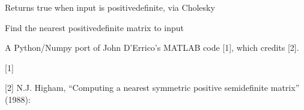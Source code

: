 \documentclass[letterpaper,10pt,english]{sphinxmanual}
\begin{document}
\begin{fulllineitems}

\begin{fulllineitems}
\label{\detokenize{classes:classes.pyETM.ETM.isPD}}
\pysigstartsignatures
{}
\pysigstopsignatures
\sphinxAtStartPar
Returns true when input is positive\sphinxhyphen{}definite, via Cholesky

\end{fulllineitems}


\begin{fulllineitems}
\label{\detokenize{classes:classes.pyETM.ETM.load_parameters}}
\pysigstartsignatures
{}
\pysigstopsignatures
\end{fulllineitems}


\begin{fulllineitems}
\label{\detokenize{classes:classes.pyETM.ETM.nearestPD}}
\pysigstartsignatures
{}
\pysigstopsignatures
\sphinxAtStartPar
Find the nearest positive\sphinxhyphen{}definite matrix to input

\sphinxAtStartPar
A Python/Numpy port of John D’Errico’s  MATLAB code {[}1{]}, which
credits {[}2{]}.

\sphinxAtStartPar
{[}1{]} 

\sphinxAtStartPar
{[}2{]} N.J. Higham, “Computing a nearest symmetric positive semidefinite
matrix” (1988): 

\end{fulllineitems}


\begin{fulllineitems}
\label{\detokenize{classes:classes.pyETM.ETM.onpick}}
\pysigstartsignatures
{}
\pysigstopsignatures
\end{fulllineitems}


\end{fulllineitems}
\end{document}
